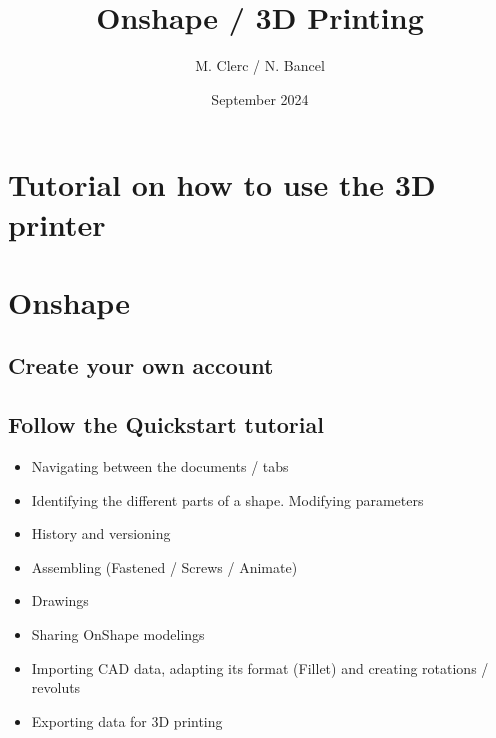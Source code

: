 \documentclass[a4paper,12pt]{article}
\begin{document}
\title{Onshape / 3D Printing}
\author{M. Clerc / N. Bancel}
\date{September 2024}
\maketitle

\section[short]{Tutorial on how to use the 3D printer}


\section[short]{Onshape}

\subsection[short]{Create your own account}

\subsection[short]{Follow the Quickstart tutorial}

\begin{itemize}[noitemsep]
  \item Navigating between the documents / tabs
  \item Identifying the different parts of a shape. Modifying parameters
  \item History and versioning
  \item Assembling (Fastened / Screws / Animate)
  \item Drawings
  \item Sharing OnShape modelings
  \item Importing CAD data, adapting its format (Fillet) and creating rotations / revoluts
  \item Exporting data for 3D printing
\end{itemize}
\end{document}
